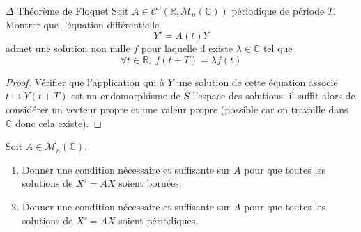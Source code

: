 \documentclass[french,a4paper]{article}
\newcommand{\R}{\mathbb{R}}
\newcommand{\C}{\mathbb{C}}
\theoremstyle{plain}
\theoremstyle{definition}
\theoremstyle{remark}
\begin{document}
\begin{ex}[Moulin.ED.35]{$\Delta$ Théorème de Floquet}
	Soit $A\in\mathcal{C}^0(\R,\mathcal{M}_n(\C))$ périodique de période $T$. Montrer que l'équation différentielle $$Y'=A(t)Y$$ admet une solution non nulle $f$ pour laquelle il existe $\lambda\in\C$ tel que $$\forall t\in\R,\ f(t+T)=\lambda f(t)$$
\end{ex}
\begin{proof}
	Vérifier que l'application qui à $Y$ une solution de cette équation associe $t\mapsto Y(t+T)$ est un endomorphisme de $S$ l'espace des solutions. il suffit alors de considérer un vecteur propre et une valeur propre (possible car on travaille dans $\C$ donc cela existe).
\end{proof}

\begin{ex}[Moulin.ED.36]{}
	Soit $A\in\mathcal{M}_n(\C)$.
	\begin{enumerate}
		\item Donner une condition nécessaire et suffisante sur $A$ pour que toutes les solutions de $X'=AX$ soient bornées.
		\item Donner une condition nécessaire et suffisante sur $A$ pour que toutes les solutions de $X'=AX$ soient périodiques.
	\end{enumerate}
\end{ex}
\end{document}
